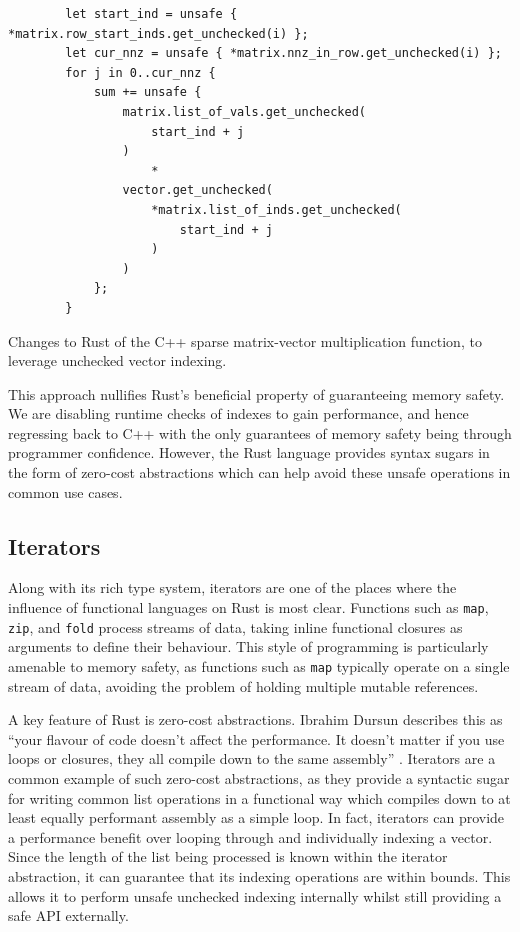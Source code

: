 \begin{listing}[H]
    \begin{verbatim}
        let start_ind = unsafe { *matrix.row_start_inds.get_unchecked(i) };
        let cur_nnz = unsafe { *matrix.nnz_in_row.get_unchecked(i) };
        for j in 0..cur_nnz {
            sum += unsafe {
                matrix.list_of_vals.get_unchecked(
                    start_ind + j
                )
                    *
                vector.get_unchecked(
                    *matrix.list_of_inds.get_unchecked(
                        start_ind + j
                    )
                )
            };
        }
    \end{verbatim}
    \caption{Changes to Rust of the C++ sparse matrix-vector multiplication function, to leverage unchecked vector indexing.}
    \label{listing:rust-sparsemv-unchecked}
\end{listing}

This approach nullifies Rust's beneficial property of guaranteeing memory safety. We are disabling runtime checks of indexes to gain performance, and hence regressing back to C++ with the only guarantees of memory safety being through programmer confidence. However, the Rust language provides syntax sugars in the form of zero-cost abstractions which can help avoid these unsafe operations in common use cases.

\subsection{Iterators}
\label{sec:translation-iterators}

Along with its rich type system, iterators are one of the places where the influence of functional languages on Rust is most clear. Functions such as \texttt{map}, \texttt{zip}, and \texttt{fold} process streams of data, taking inline functional closures as arguments to define their behaviour. This style of programming is particularly amenable to memory safety, as functions such as \texttt{map} typically operate on a single stream of data, avoiding the problem of holding multiple mutable references.

A key feature of Rust is zero-cost abstractions. Ibrahim Dursun describes this as ``your flavour of code doesn’t affect the performance. It doesn’t matter if you use loops or closures, they all compile down to the same assembly'' \cite{RustZeroCost2020}. Iterators are a common example of such zero-cost abstractions, as they provide a syntactic sugar for writing common list operations in a functional way which compiles down to at least equally performant assembly as a simple loop. In fact, iterators can provide a performance benefit over looping through and individually indexing a vector. Since the length of the list being processed is known within the iterator abstraction, it can guarantee that its indexing operations are within bounds. This allows it to perform unsafe unchecked indexing internally whilst still providing a safe API externally.

